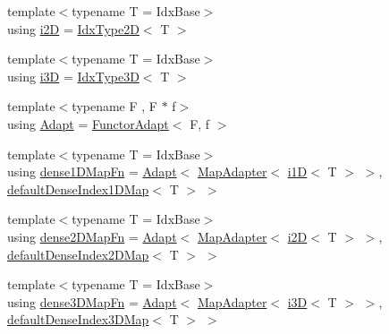 \begin{DoxyCompactItemize}
\item 
{\footnotesize template$<$typename T  = Idx\+Base$>$ }\\using \hyperlink{namespacevt_1_1mapping_a6448c875e0807b43f31e96fc5b0cec04}{i2D} = \hyperlink{namespacevt_ab0fbc5ddf69b5aa0ed6a8d1658b504eb}{Idx\+Type2D}$<$ T $>$
\item 
{\footnotesize template$<$typename T  = Idx\+Base$>$ }\\using \hyperlink{namespacevt_1_1mapping_af435b967b9ed1ccb5ec4effdbd9abd13}{i3D} = \hyperlink{namespacevt_a65e4a83c0567ecb7a54b78e9b8e7d7ab}{Idx\+Type3D}$<$ T $>$
\item 
{\footnotesize template$<$typename F , F $\ast$ f$>$ }\\using \hyperlink{namespacevt_1_1mapping_ab3efa0ad45a85d80210d4acef3bb6c22}{Adapt} = \hyperlink{namespacevt_1_1mapping_a9502cb3a918b8389f64351638edab39f}{Functor\+Adapt}$<$ F, f $>$
\item 
{\footnotesize template$<$typename T  = Idx\+Base$>$ }\\using \hyperlink{namespacevt_1_1mapping_aaedaf84c7a2cac3bae6701cc982a76c7}{dense1\+D\+Map\+Fn} = \hyperlink{namespacevt_1_1mapping_ab3efa0ad45a85d80210d4acef3bb6c22}{Adapt}$<$ \hyperlink{namespacevt_1_1mapping_a41b113c28bb6430fbcb5be66e08ccf9f}{Map\+Adapter}$<$ \hyperlink{namespacevt_1_1mapping_af0c14a9a77e0311b3d089143ed93ba76}{i1D}$<$ T $>$ $>$, \hyperlink{namespacevt_1_1mapping_ae055a42b89a59fd6d0cc6d40f9abf3b5}{default\+Dense\+Index1\+D\+Map}$<$ T $>$ $>$
\item 
{\footnotesize template$<$typename T  = Idx\+Base$>$ }\\using \hyperlink{namespacevt_1_1mapping_aa9d0a056d56894602a35dfb8befdd812}{dense2\+D\+Map\+Fn} = \hyperlink{namespacevt_1_1mapping_ab3efa0ad45a85d80210d4acef3bb6c22}{Adapt}$<$ \hyperlink{namespacevt_1_1mapping_a41b113c28bb6430fbcb5be66e08ccf9f}{Map\+Adapter}$<$ \hyperlink{namespacevt_1_1mapping_a6448c875e0807b43f31e96fc5b0cec04}{i2D}$<$ T $>$ $>$, \hyperlink{namespacevt_1_1mapping_a011c4e2cb832d3edcd98e3803d405ad4}{default\+Dense\+Index2\+D\+Map}$<$ T $>$ $>$
\item 
{\footnotesize template$<$typename T  = Idx\+Base$>$ }\\using \hyperlink{namespacevt_1_1mapping_a9fd899bf55eeeeae4a8dac3f47fd88ad}{dense3\+D\+Map\+Fn} = \hyperlink{namespacevt_1_1mapping_ab3efa0ad45a85d80210d4acef3bb6c22}{Adapt}$<$ \hyperlink{namespacevt_1_1mapping_a41b113c28bb6430fbcb5be66e08ccf9f}{Map\+Adapter}$<$ \hyperlink{namespacevt_1_1mapping_af435b967b9ed1ccb5ec4effdbd9abd13}{i3D}$<$ T $>$ $>$, \hyperlink{namespacevt_1_1mapping_a776a69138a1fbceab5bbf10b9c07a858}{default\+Dense\+Index3\+D\+Map}$<$ T $>$ $>$

\end{DoxyCompactItemize}
